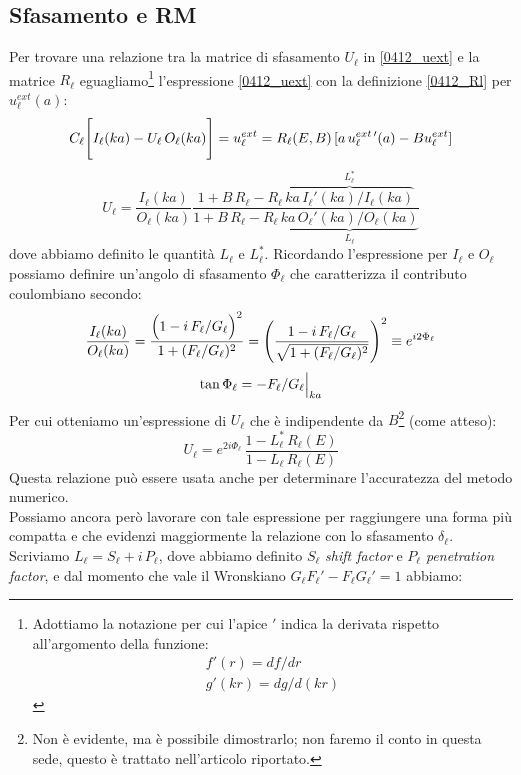 \subsection{Sfasamento e RM}
Per trovare una relazione tra la matrice di sfasamento $U_\ell$ in \eqref{0412_uext} e la matrice $R_\ell$ eguagliamo\footnote{Adottiamo la notazione per cui l'apice $'$ indica la derivata rispetto all'argomento della funzione:%
\begin{displaymath}%
\begin{array}{l}
	f'(r) = df/dr \\
	g'(kr) = dg/d(kr)
\end{array}
\end{displaymath}%
} l'espressione \eqref{0412_uext} con la definizione \eqref{0412_Rl} per $u^{ext}_\ell (a)$:
$$ C_\ell \Biggl [ I_\ell(ka) - U_\ell \, O_\ell(ka) \Biggr ] = u_\ell^{ext} = R_\ell(E,B) \,[a \, u_\ell^{ext\,\prime}  (a) - B u_\ell^{ext}] $$
$$U_\ell = \frac{I_\ell(ka)}{O_\ell(ka)} \frac{1+B\, R_\ell -R_\ell \, \overbrace{ka \, I_\ell ' (ka)/I_\ell (ka)}^{L_\ell^*}}{1+B\, R_\ell - R_\ell \, \underbrace{ka \,  O_\ell ' (ka)/O_\ell (ka)}_{L_\ell}}$$
dove abbiamo definito le quantità $L_\ell$ e $L_\ell^*$. Ricordando l'espressione per $I_\ell$ e $O_\ell$ possiamo definire un'angolo di sfasamento $\Phi_\ell$ che caratterizza il contributo coulombiano secondo:
$$\frac{I_\ell (ka)}{O_\ell (ka)} = \frac{\Bigl ( 1-i \, F_\ell/G_\ell \Bigr )^2}{1 + (F_\ell/G_\ell)^2} = \Biggl ( \frac{1-i\, F_\ell/G_\ell}{\sqrt{1 + (F_\ell/G_\ell)^2}} \Biggr )^2 \equiv e^{i2\Phi_\ell}$$
$$\tan{\Phi_\ell} = - F_\ell / G_\ell\Bigl |_{ka}$$
Per cui otteniamo un'espressione di $U_\ell$ che è indipendente da $B$\footnote{Non è evidente, ma è possibile dimostrarlo; non faremo il conto in questa sede, questo è trattato nell'articolo riportato.} (come atteso): 
$$U_\ell = e^{2i\Phi_\ell} \, \frac{1-L_\ell^* \, R_\ell (E)}{1-L_\ell  \, R_\ell (E)}$$
Questa relazione può essere usata anche per determinare l'accuratezza del metodo numerico. 
\\
Possiamo ancora però lavorare con tale espressione per raggiungere una forma più compatta e che evidenzi maggiormente la relazione con lo sfasamento $\delta_\ell$. Scriviamo $L_\ell = S_\ell + i \, P_\ell$, dove abbiamo definito $S_\ell$ \textit{shift factor} e $P_\ell$ \textit{penetration factor}, e dal momento che vale il Wronskiano $G_\ell F_\ell ' - F_\ell G_\ell ' = 1$ abbiamo:
